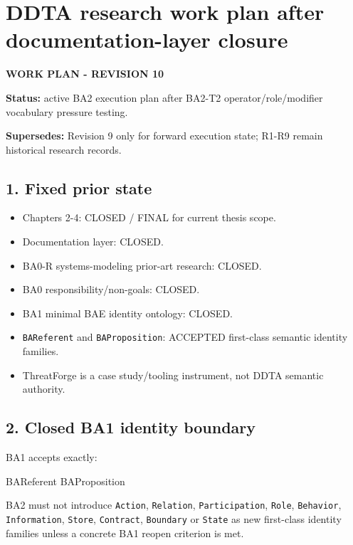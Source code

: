 \documentclass[
  10pt,
  letterpaper,
]{article}
\author{}
\date{}
\newenvironment{Shaded}{}{}
\newcommand{\NormalTok}[1]{#1}
\providecommand{\tightlist}{%
  \setlength{\itemsep}{0pt}\setlength{\parskip}{0pt}}
\begin{document}
\section{DDTA research work plan after documentation-layer
closure}\label{ddta-research-work-plan-after-documentation-layer-closure}

\textbf{WORK PLAN - REVISION 10}

\textbf{Status:} active BA2 execution plan after BA2-T2
operator/role/modifier vocabulary pressure testing.

\textbf{Supersedes:} Revision 9 only for forward execution state; R1-R9
remain historical research records.

\subsection{1. Fixed prior state}\label{fixed-prior-state}

\begin{itemize}
\tightlist
\item
  Chapters 2-4: CLOSED / FINAL for current thesis scope.
\item
  Documentation layer: CLOSED.
\item
  BA0-R systems-modeling prior-art research: CLOSED.
\item
  BA0 responsibility/non-goals: CLOSED.
\item
  BA1 minimal BAE identity ontology: CLOSED.
\item
  \texttt{BAReferent} and \texttt{BAProposition}: ACCEPTED first-class
  semantic identity families.
\item
  ThreatForge is a case study/tooling instrument, not DDTA semantic
  authority.
\end{itemize}

\subsection{2. Closed BA1 identity
boundary}\label{closed-ba1-identity-boundary}

BA1 accepts exactly:

\begin{Shaded}
\begin{Highlighting}[]
\NormalTok{BAReferent}
\NormalTok{BAProposition}
\end{Highlighting}
\end{Shaded}

BA2 must not introduce \texttt{Action}, \texttt{Relation},
\texttt{Participation}, \texttt{Role}, \texttt{Behavior},
\texttt{Information}, \texttt{Store}, \texttt{Contract},
\texttt{Boundary} or \texttt{State} as new first-class identity families
unless a concrete BA1 reopen criterion is met.
\end{document}
